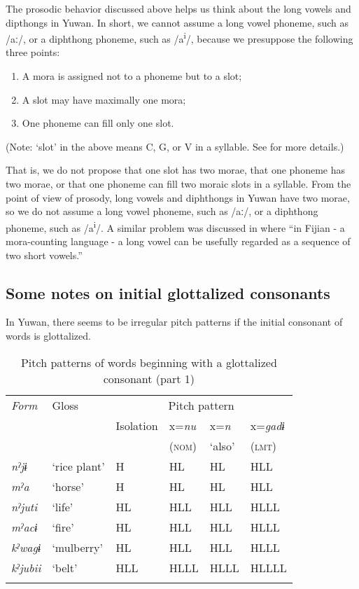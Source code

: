 The prosodic behavior discussed above helps us think about the long vowels and dipthongs in Yuwan. In short, we cannot assume a long vowel phoneme, such as /aː/, or a diphthong phoneme, such as /a\textsuperscript{i}/, because we presuppose the following three points:

\begin{enumerate}[label=\alph*.]
\item A mora is assigned not to a phoneme but to a slot;
\item A slot may have maximally one mora;
\item One phoneme can fill only one slot.
\end{enumerate}

(Note: ‘slot’ in the above means C, G, or V in a syllable. See  for more details.)

That is, we do not propose that one slot has two morae, that one phoneme has two morae, or that one phoneme can fill two moraic slots in a syllable. From the point of view of prosody, long vowels and diphthongs in Yuwan have two morae, so we do not assume a long vowel phoneme, such as /aː/, or a diphthong phoneme, such as /a\textsuperscript{i}/. A similar problem was discussed in \citet[196-199]{Dixon2010} where “in Fijian - a mora-counting language - a long vowel can be usefully regarded as a sequence of two short vowels.”

\subsection{Some notes on initial glottalized consonants}
\label{bkm:Ref347180628}\hypertarget{RefHeadingToc395696985}{}
In Yuwan, there seems to be irregular pitch patterns if the initial consonant of words is glottalized.

\begin{table}
\caption{Pitch patterns of words beginning with a glottalized consonant (part 1)}
\begin{tabular}{>{\itshape}llllll}
\lsptoprule
\normalfont Form & Gloss & \multicolumn{4}{c}{Pitch pattern}\\\cmidrule(lr){3-6}
     &       & Isolation & x=\textit{nu} & x=\textit{n} & x=\textit{gadɨ}\\
     &       &           & (\textsc{nom}) & ‘also’ & (\textsc{lmt})\\\midrule
nˀjɨ    &  ‘rice plant’ &  H   & HL   & HL   &  HLL\\
mˀa     &  ‘horse’       &  H   & HL   & HL   &  HLL\\
nˀjuti  &  ‘life’     &  HL  & HLL  & HLL  &  HLLL\\
mˀacɨ   &  ‘fire’      &  HL  & HLL  & HLL  &  HLLL\\
kˀwagɨ  &  ‘mulberry’ &  HL  & HLL  & HLL  &  HLLL\\
kˀjubii &  ‘belt’    &  HLL & HLLL & HLLL &  HLLLL\\
\lspbottomrule
\end{tabular}
\end{table}


